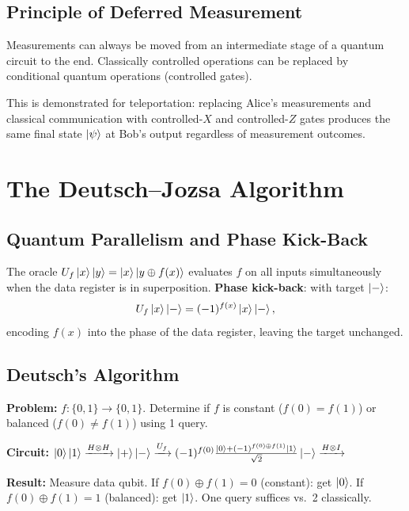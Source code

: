 \documentclass[10pt,a4paper]{article}
\begin{document}
\subsection{Principle of Deferred Measurement}

\begin{tcolorbox}[propstyle, title={Principle}]
Measurements can always be moved from an intermediate stage of a quantum circuit to the end. Classically controlled operations can be replaced by conditional quantum operations (controlled gates).
\end{tcolorbox}

This is demonstrated for teleportation: replacing Alice's measurements and classical communication with controlled-$X$ and controlled-$Z$ gates produces the same final state $\ket{\psi}$ at Bob's output regardless of measurement outcomes.
\section{The Deutsch--Jozsa Algorithm}

\subsection{Quantum Parallelism and Phase Kick-Back}

The oracle $U_f\ket{x}\ket{y}=\ket{x}\ket{y\oplus f(x)}$ evaluates $f$ on all inputs simultaneously when the data register is in superposition. \textbf{Phase kick-back}: with target $\ket{-}$:
\[
U_f\ket{x}\ket{-}=(-1)^{f(x)}\ket{x}\ket{-},
\]
encoding $f(x)$ into the phase of the data register, leaving the target unchanged.

\subsection{Deutsch's Algorithm}

\begin{tcolorbox}[algostyle, title={Algorithm}]
\textbf{Problem:} $f:\{0,1\}\to\{0,1\}$. Determine if $f$ is constant ($f(0)=f(1)$) or balanced ($f(0)\neq f(1)$) using 1 query.

\textbf{Circuit:} $\ket{0}\ket{1}\xrightarrow{H\otimes H}\ket{+}\ket{-}\xrightarrow{U_f}(-1)^{f(0)}\frac{\ket{0}+(-1)^{f(0)\oplus f(1)}\ket{1}}{\sqrt{2}}\ket{-}\xrightarrow{H\otimes I}$

\textbf{Result:} Measure data qubit. If $f(0)\oplus f(1)=0$ (constant): get $\ket{0}$. If $f(0)\oplus f(1)=1$ (balanced): get $\ket{1}$. One query suffices vs.\ 2 classically.
\end{tcolorbox}
\end{document}
